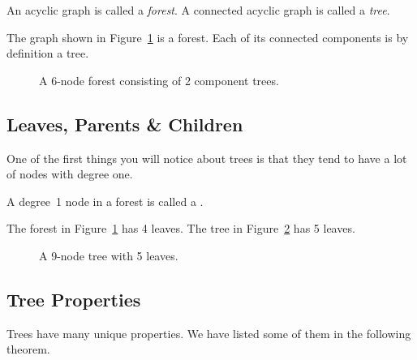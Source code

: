 \begin{definition}\label{def:tree}
An acyclic graph is called a \emph{forest}.  A connected acyclic graph
is called a \emph{tree}.
\end{definition}

The graph shown in Figure~\ref{fig:5I} is a forest.  Each of its
connected components is by definition a tree.

\begin{figure}
\caption{A 6-node forest consisting of 2 component trees.}
\label{fig:5I}
\end{figure}

\iffalse
As we have just seen, finding good cycles in a graph can be trickier than
you might first think.  But what if a graph has no cycles at all?  Sounds
pretty dull.
  But graphs without cycles, called \emph{acyclic graphs}, are
probably the most important graphs of all when it comes to computer
science.\fi

\subsection{Leaves, Parents \& Children}

One of the first things you will notice about trees is that they tend
to have a lot of nodes with degree one.  
\begin{definition}
A degree~1 node in a forest is called a .
\end{definition}

The forest in Figure~\ref{fig:5I} has 4 leaves.  The tree in
Figure~\ref{fig:5H} has 5 leaves.

\begin{figure}
\caption{A 9-node tree with 5 leaves.}
\label{fig:5H}
\end{figure}

\subsection{Tree Properties}

Trees have many unique properties.  We have listed some of them in the
following theorem.

